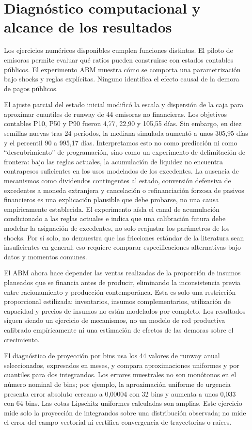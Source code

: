 \documentclass[11pt,a4paper]{article}
\begin{document}
\section{Diagnóstico computacional y alcance de los resultados}
Los ejercicios numéricos disponibles cumplen funciones distintas. El piloto de emisoras permite evaluar qué ratios pueden construirse con estados contables públicos. El experimento ABM muestra cómo se comporta una parametrización bajo shocks y reglas explícitas. Ninguno identifica el efecto causal de la demora de pagos públicos.

El ajuste parcial del estado inicial modificó la escala y dispersión de la caja para aproximar cuantiles de runway de 44 emisoras no financieras. Los objetivos contables P10, P50 y P90 fueron 4,77, 22,90 y 105,55 días. Sin embargo, en diez semillas nuevas tras 24 períodos, la mediana simulada aumentó a unos 305,95 días y el percentil 90 a 995,17 días. Interpretamos esto no como predicción ni como “descubrimiento” de programación, sino como un experimento de delimitación de frontera: bajo las reglas actuales, la acumulación de liquidez no encuentra contrapesos suficientes en los usos modelados de los excedentes. La ausencia de mecanismos como dividendos contingentes al estado, conversión defensiva de excedentes a moneda extranjera y cancelación o refinanciación forzosa de pasivos financieros es una explicación plausible que debe probarse, no una causa empíricamente establecida. El experimento aísla el canal de acumulación condicionado a las reglas actuales e indica que una calibración futura debe modelar la asignación de excedentes, no solo reajustar los parámetros de los shocks. Por sí solo, no demuestra que las fricciones estándar de la literatura sean insuficientes en general; eso requiere comparar especificaciones alternativas bajo datos y momentos comunes.

El ABM ahora hace depender las ventas realizadas de la proporción de insumos planeados que se financia antes de producir, eliminando la inconsistencia previa entre racionamiento y producción contemporánea. Esta es solo una restricción proporcional estilizada: inventarios, insumos complementarios, utilización de capacidad y precios de insumos no están modelados por completo. Los resultados siguen siendo un ejercicio de mecanismos, no un modelo de red productiva calibrado empíricamente ni una estimación de efectos de las demoras sobre el crecimiento.

El diagnóstico de proyección por bins usa los 44 valores de runway anual seleccionados, expresados en meses, y compara aproximaciones uniformes y por cuantiles para dos integrandos. Los errores muestrales no son monótonos en el número nominal de bins; por ejemplo, la aproximación uniforme de urgencia presenta error absoluto cercano a 0,00004 con 32 bins y aumenta a unos 0,033 con 64 bins. Las cotas Lipschitz uniformes calculadas son amplias. Este ejercicio mide solo la proyección de integrandos sobre una distribución observada; no mide el error del campo vectorial ni certifica convergencia de trayectorias o raíces.
\end{document}
